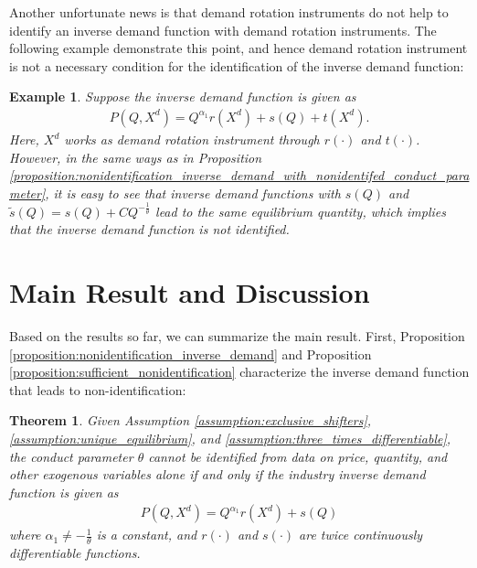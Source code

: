 \documentclass[11pt, a4paper]{article}
\newtheorem{theorem}{Theorem}
\newtheorem{example}{Example}
\theoremstyle{remark}
\begin{document}
Another unfortunate news is that demand rotation instruments do not help to identify an inverse demand function with demand rotation instruments.
The following example demonstrate this point, and hence demand rotation instrument is not a necessary condition for the identification of the inverse demand function:
\begin{example}\label{example:demand_rotation_instrument_does_not_help_identification}
    Suppose the inverse demand function is given as
    \begin{align}
        P(Q, X^{d}) = Q^{\alpha_1}r(X^{d}) + s(Q) + t(X^{d}).
    \end{align}
    Here, $X^{d}$ works as demand rotation instrument through $r(\cdot)$ and $t(\cdot)$.
    However, in the same ways as in Proposition \ref{proposition:nonidentification_inverse_demand_with_nonidentifed_conduct_parameter}, it is easy to see that inverse demand functions with $s(Q)$ and $\tilde{s}(Q) = s(Q) + C Q^{-\frac{1}{\theta}}$ lead to the same equilibrium quantity, which implies that the inverse demand function is not identified.
\end{example}





\section{Main Result and Discussion}\label{sec:main_result_and_discussion}
Based on the results so far, we can summarize the main result.
First, Proposition \ref{proposition:nonidentification_inverse_demand} and Proposition \ref{proposition:sufficient_nonidentification} characterize the inverse demand function that leads to non-identification:
\begin{theorem}\label{theorem:identification_characterization}
    Given Assumption \ref{assumption:exclusive_shifters}, \ref{assumption:unique_equilibrium}, and \ref{assumption:three_times_differentiable}, the conduct parameter $\theta$ cannot be identified from data on price, quantity, and other exogenous variables alone if and only if the industry inverse demand function is given as
    \begin{align}
        P(Q, X^{d}) = Q^{\alpha_1}r(X^{d}) + s(Q)
    \end{align}
    where $\alpha_1 \ne -\frac{1}{\theta}$ is a constant, and $r(\cdot)$ and $s(\cdot)$ are twice continuously differentiable functions.
\end{theorem}
\end{document}
